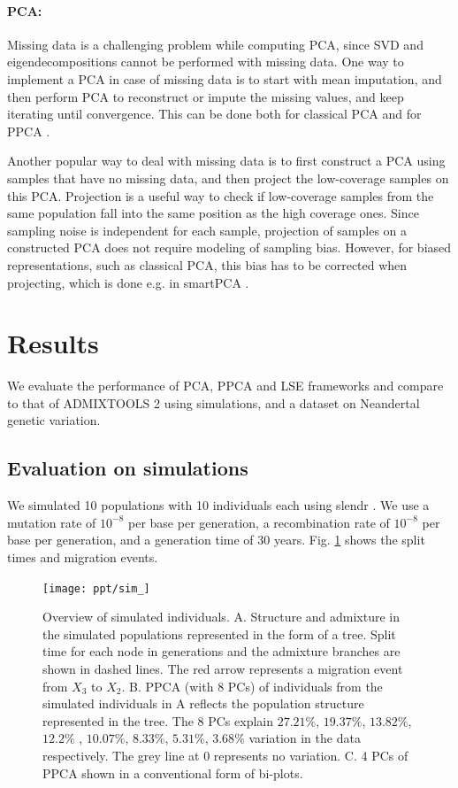 \documentclass[12pt, letterpaper]{article}
\begin{document}
\paragraph{PCA:}
Missing data is a challenging problem while computing PCA, since SVD and eigendecompositions cannot be performed with missing data. One way to implement a PCA in case of missing data is to start with mean imputation, and then perform PCA to reconstruct or impute the missing values, and keep iterating until convergence. This can be done both for classical PCA \cite{meisner_large-scale_2021} and for PPCA \cite{tipping_probabilistic_nodate}.  

Another popular way to deal with missing data is to first construct a PCA using samples that have no missing data, and then project the low-coverage samples on this PCA. Projection is a useful way to check if low-coverage samples from the same population fall into the same position as the high coverage ones. Since sampling noise is independent for each sample, projection of samples on a constructed PCA does not require modeling of sampling bias. However, for biased representations, such as classical PCA, this bias has to be corrected when projecting, which is done e.g. in smartPCA \cite{patterson_population_2006}.

\section{Results}
We evaluate the performance of PCA, PPCA and LSE frameworks and compare to that of ADMIXTOOLS 2 \cite{maier_limits_2022} using simulations, and a dataset on Neandertal genetic variation. 

\subsection{Evaluation on simulations}
We simulated 10 populations with 10 individuals each using slendr \cite{petr_slendr_2022}. We use a mutation rate of $10^{-8}$ per base per generation, a recombination rate of $10^{-8}$ per base per generation, and a generation time of 30 years. Fig. \ref{fig2:sim} shows the split times and migration events. 

\begin{figure}[ht!]
    \texttt{[image: ppt/sim\_]}
    \centering
    \caption{Overview of simulated individuals. A. Structure and admixture in the simulated populations represented in the form of a tree. Split time for each node in generations and the admixture branches are shown in dashed lines. The red arrow represents a migration event from $X_3$ to $X_2$. B. PPCA (with 8 PCs) of individuals from the simulated individuals in A reflects the population structure represented in the tree. The 8 PCs explain $27.21\%$, $19.37\%$, $13.82\%$, $12.2\%$ , $10.07\%$,  $8.33\%$,  $5.31\%$,  $3.68\%$ variation in the data respectively. The grey line at 0 represents no variation. C. 4 PCs of PPCA shown in a conventional form of bi-plots.
}
    \label{fig2:sim}
\end{figure}
\end{document}
